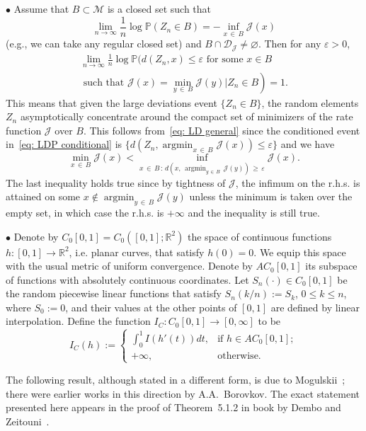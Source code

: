 \documentclass[AHL,Unicode,published]{cedram}
\newcommand{\Rbb}{\mathbb{R}}
\newcommand{\Pbb}{\mathbb{P}}
\newcommand{\Dcl}{\mathcal{D}}
\newcommand{\Jcl}{\mathcal{J}}
\newcommand{\Mcl}{\mathcal{M}}
\newcommand{\argmin}{\mathop{\mathrm{argmin}}\nolimits}
\begin{document}
$\bullet$ Assume that $B \subset \Mcl$ is a closed set such that
\[
\lim_{n\to\infty} \frac1n \log \Pbb\left(Z_n\in B\right) =-\inf_{x\,\in\,B}\Jcl(x)
\]
(e.g., we can take any regular closed set) and $B \cap \Dcl_{\Jcl} \neq \varnothing$. Then for any $\varepsilon >0$,
\begin{multline}\label{eq: LDP conditional}
\lim_{n\to\infty}\frac1n\log \Pbb\Big(d(Z_n,x) \le \varepsilon \text{ for some } x \in B \\
\left.\text{ such that } \Jcl(x) = \min_{y\,\in\,B} \Jcl(y) \Big|  Z_n \in B \right) =1. 
\end{multline}
This means that given the large deviations event $\{Z_n \in B\}$, the random elements $Z_n$ asymptotically concentrate around the compact set of minimizers of the rate function $\Jcl$ over $B$. This follows from~\eqref{eq: LD general} since the conditioned event in~\eqref{eq: LDP conditional} is $\{d(Z_n, \argmin_{x\,\in\,B} \Jcl(x)) \le\varepsilon \big\}$ and we have
\[
\min_{x\,\in\,B} \Jcl(x) < \inf_{x\,\in\,B\,: \, d\left(x,\, \argmin_{y\,\in\,B}\,\Jcl(y)\right)\,\ge\,\varepsilon} \Jcl(x).
\]
The last inequality holds true since by tightness of $ \Jcl$, the infimum on the r.h.s. is attained on some $x \not \in \argmin_{y\,\in\,B} \Jcl(y)$ unless the minimum is taken over the empty set, in which case the r.h.s. is $+\infty$ and the inequality is still true.

$\bullet$ Denote by $C_0[0,1]=C_0([0,1];\Rbb^2)$ the space of continuous functions $h:[0,1] \to \Rbb^2$, i.e. planar curves, that satisfy $h(0)=0$. We equip this space with the usual metric of uniform convergence. Denote by $AC_0[0,1]$ its subspace of functions with absolutely continuous coordinates. Let $S_n(\cdot) \in C_0[0,1]$ be the random piecewise linear functions that satisfy $S_n(k/n):=S_k$, $0 \le k \le n$, where $S_0:=0$, and their values at the other points of $[0,1]$ are defined by linear interpolation. Define the function $I_C: C_0[0,1] \to [0, \infty]$ to be
\begin{equation}\label{eq: I def}
I_C(h):=
\begin{cases}
\int_0^1 I(h'(t)) dt, & \text{if } h \in AC_0[0,1]; \\
+\infty, & \text{otherwise}.
\end{cases}
\end{equation}

The following result, although stated in a different form, is due to Mogulskii~\cite[Theorem~2, Part II]{Mogulskii}; there were earlier works in this direction by A.A.\ Borovkov. The exact statement presented here appears in the proof of Theorem~5.1.2 in book by Dembo and Zeitouni~\cite{DemboZeitouni}.
\end{document}
